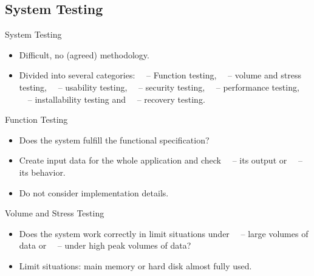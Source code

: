\subsection{System Testing}

\begin{Frame}{System Testing}
  \begin{itemize}
    \item Difficult, no (agreed) methodology.
    \item Divided into several categories:\newline
      \ \ -- Function testing, \newline
      \ \ -- volume and stress testing, \newline
      \ \ -- usability testing, \newline
      \ \ -- security testing, \newline
      \ \ -- performance testing, \newline
      \ \ -- installability testing and \newline
      \ \ -- recovery testing.
  \end{itemize}
\end{Frame}

\begin{Frame}{Function Testing}
  \begin{itemize}
    \item Does the system fulfill the functional specification?
    \item Create input data for the whole application and check \newline
      \ \ -- its output or\newline
      \ \ -- its behavior.
    \item Do not consider implementation details.
  \end{itemize}
\end{Frame}

\begin{Frame}{Volume and Stress Testing}
  \begin{itemize}
    \item Does the system work correctly in limit situations under \newline
      \ \ -- large volumes of data or\newline
      \ \ -- under high peak volumes of data?
    \item Limit situations: main memory or hard disk almost fully used.
  \end{itemize}
\end{Frame}

